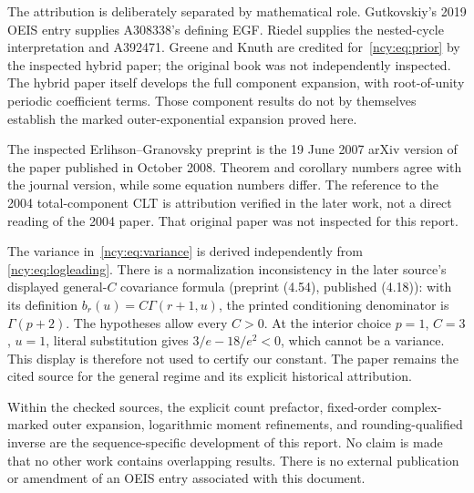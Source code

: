\documentclass[11pt,letterpaper]{article}
\numberwithin{equation}{section}
\theoremstyle{remark}\newtheorem{remark}[theorem]{Remark}
\theoremstyle{definition}\newtheorem{definition}[theorem]{Definition}\theoremstyle{plain}
\begin{document}
The attribution is deliberately separated by mathematical role.
Gutkovskiy's 2019 OEIS entry supplies A308338's defining EGF. Riedel
supplies the nested-cycle interpretation and A392471. Greene and
Knuth are credited for~\eqref{ncy:eq:prior} by the inspected hybrid paper;
the original book was not independently inspected. The hybrid paper
itself develops the full component expansion, with root-of-unity
periodic coefficient terms. Those component results do not by
themselves establish the marked outer-exponential expansion proved
here.

The inspected Erlihson--Granovsky preprint is the 19 June 2007
arXiv version of the paper published in October 2008. Theorem and
corollary numbers agree with the journal version, while some equation
numbers differ. The reference to the 2004 total-component CLT is
attribution verified in the later work, not a direct reading of the
2004 paper. That original paper was not inspected for this report.

The variance in~\eqref{ncy:eq:variance} is derived independently from
\eqref{ncy:eq:logleading}. There is a normalization inconsistency in the
later source's displayed general-$C$ covariance formula (preprint
(4.54), published (4.18)): with its definition
$b_r(u)=C\Gamma(r+1,u)$, the printed conditioning denominator is
$\Gamma(p+2)$. The hypotheses allow every $C>0$. At the interior choice
$p=1$, $C=3$, $u=1$, literal substitution gives
$3/e-18/e^2<0$, which cannot be a variance.
This display is therefore not used to certify our constant. The
paper remains the cited source for the general regime and its explicit
historical attribution.

Within the checked sources, the explicit count prefactor, fixed-order
complex-marked outer expansion, logarithmic moment refinements, and
rounding-qualified inverse are the sequence-specific development of
this report. No claim is made that no other work contains overlapping
results. There is no external publication or amendment of an OEIS
entry associated with this document.
\end{document}
